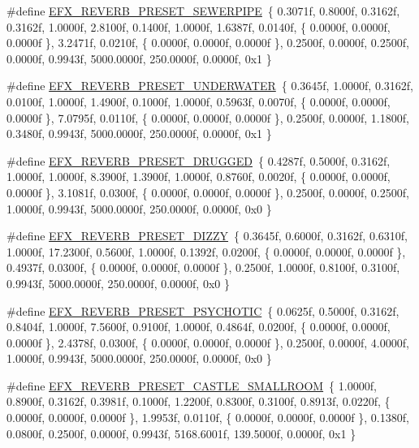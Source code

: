 \begin{DoxyCompactItemize}
\#define \hyperlink{efx-presets_8h_a51a0c280deb8768e50ec99bb8afd00f7}{E\+F\+X\+\_\+\+R\+E\+V\+E\+R\+B\+\_\+\+P\+R\+E\+S\+E\+T\+\_\+\+S\+E\+W\+E\+R\+P\+I\+PE}~\{ 0.\+3071f, 0.\+8000f, 0.\+3162f, 0.\+3162f, 1.\+0000f, 2.\+8100f, 0.\+1400f, 1.\+0000f, 1.\+6387f, 0.\+0140f, \{ 0.\+0000f, 0.\+0000f, 0.\+0000f \}, 3.\+2471f, 0.\+0210f, \{ 0.\+0000f, 0.\+0000f, 0.\+0000f \}, 0.\+2500f, 0.\+0000f, 0.\+2500f, 0.\+0000f, 0.\+9943f, 5000.\+0000f, 250.\+0000f, 0.\+0000f, 0x1 \}
\item 
\#define \hyperlink{efx-presets_8h_a507d85d1c0b55bb3ba82360f48e50506}{E\+F\+X\+\_\+\+R\+E\+V\+E\+R\+B\+\_\+\+P\+R\+E\+S\+E\+T\+\_\+\+U\+N\+D\+E\+R\+W\+A\+T\+ER}~\{ 0.\+3645f, 1.\+0000f, 0.\+3162f, 0.\+0100f, 1.\+0000f, 1.\+4900f, 0.\+1000f, 1.\+0000f, 0.\+5963f, 0.\+0070f, \{ 0.\+0000f, 0.\+0000f, 0.\+0000f \}, 7.\+0795f, 0.\+0110f, \{ 0.\+0000f, 0.\+0000f, 0.\+0000f \}, 0.\+2500f, 0.\+0000f, 1.\+1800f, 0.\+3480f, 0.\+9943f, 5000.\+0000f, 250.\+0000f, 0.\+0000f, 0x1 \}
\item 
\#define \hyperlink{efx-presets_8h_a45a589369c56c50c8e4017caafae954d}{E\+F\+X\+\_\+\+R\+E\+V\+E\+R\+B\+\_\+\+P\+R\+E\+S\+E\+T\+\_\+\+D\+R\+U\+G\+G\+ED}~\{ 0.\+4287f, 0.\+5000f, 0.\+3162f, 1.\+0000f, 1.\+0000f, 8.\+3900f, 1.\+3900f, 1.\+0000f, 0.\+8760f, 0.\+0020f, \{ 0.\+0000f, 0.\+0000f, 0.\+0000f \}, 3.\+1081f, 0.\+0300f, \{ 0.\+0000f, 0.\+0000f, 0.\+0000f \}, 0.\+2500f, 0.\+0000f, 0.\+2500f, 1.\+0000f, 0.\+9943f, 5000.\+0000f, 250.\+0000f, 0.\+0000f, 0x0 \}
\item 
\#define \hyperlink{efx-presets_8h_afae1b7284621db910ef4f29390640cd8}{E\+F\+X\+\_\+\+R\+E\+V\+E\+R\+B\+\_\+\+P\+R\+E\+S\+E\+T\+\_\+\+D\+I\+Z\+ZY}~\{ 0.\+3645f, 0.\+6000f, 0.\+3162f, 0.\+6310f, 1.\+0000f, 17.\+2300f, 0.\+5600f, 1.\+0000f, 0.\+1392f, 0.\+0200f, \{ 0.\+0000f, 0.\+0000f, 0.\+0000f \}, 0.\+4937f, 0.\+0300f, \{ 0.\+0000f, 0.\+0000f, 0.\+0000f \}, 0.\+2500f, 1.\+0000f, 0.\+8100f, 0.\+3100f, 0.\+9943f, 5000.\+0000f, 250.\+0000f, 0.\+0000f, 0x0 \}
\item 
\#define \hyperlink{efx-presets_8h_ad8163f43e1716894be621dcd79d54d2c}{E\+F\+X\+\_\+\+R\+E\+V\+E\+R\+B\+\_\+\+P\+R\+E\+S\+E\+T\+\_\+\+P\+S\+Y\+C\+H\+O\+T\+IC}~\{ 0.\+0625f, 0.\+5000f, 0.\+3162f, 0.\+8404f, 1.\+0000f, 7.\+5600f, 0.\+9100f, 1.\+0000f, 0.\+4864f, 0.\+0200f, \{ 0.\+0000f, 0.\+0000f, 0.\+0000f \}, 2.\+4378f, 0.\+0300f, \{ 0.\+0000f, 0.\+0000f, 0.\+0000f \}, 0.\+2500f, 0.\+0000f, 4.\+0000f, 1.\+0000f, 0.\+9943f, 5000.\+0000f, 250.\+0000f, 0.\+0000f, 0x0 \}
\item 
\#define \hyperlink{efx-presets_8h_a9e21af4806035fc51af8fe4afadd1189}{E\+F\+X\+\_\+\+R\+E\+V\+E\+R\+B\+\_\+\+P\+R\+E\+S\+E\+T\+\_\+\+C\+A\+S\+T\+L\+E\+\_\+\+S\+M\+A\+L\+L\+R\+O\+OM}~\{ 1.\+0000f, 0.\+8900f, 0.\+3162f, 0.\+3981f, 0.\+1000f, 1.\+2200f, 0.\+8300f, 0.\+3100f, 0.\+8913f, 0.\+0220f, \{ 0.\+0000f, 0.\+0000f, 0.\+0000f \}, 1.\+9953f, 0.\+0110f, \{ 0.\+0000f, 0.\+0000f, 0.\+0000f \}, 0.\+1380f, 0.\+0800f, 0.\+2500f, 0.\+0000f, 0.\+9943f, 5168.\+6001f, 139.\+5000f, 0.\+0000f, 0x1 \}

\end{DoxyCompactItemize}
